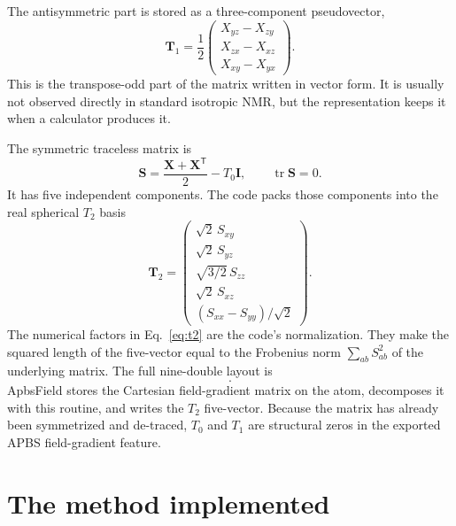 \documentclass[11pt]{article}
\begin{document}
The antisymmetric part is stored as a three-component pseudovector,
\begin{equation}
  \bm T_1 =
  \frac{1}{2}
  \begin{pmatrix}
    X_{yz}-X_{zy}\\
    X_{zx}-X_{xz}\\
    X_{xy}-X_{yx}
  \end{pmatrix}.
  \label{eq:t1}
\end{equation}
This is the transpose-odd part of the matrix written in vector form. It is
usually not observed directly in standard isotropic NMR, but the representation
keeps it when a calculator produces it.

The symmetric traceless matrix is
\begin{equation}
  \bm S =
  \frac{\bm X+\bm X^{\mathsf T}}{2}
  - T_0\bm I ,
  \qquad \operatorname{tr}\bm S=0 .
  \label{eq:sym-traceless}
\end{equation}
It has five independent components. The code packs those components into the
real spherical \(T_2\) basis
\begin{equation}
  \bm T_2 =
  \begin{pmatrix}
    \sqrt{2}\,S_{xy}\\
    \sqrt{2}\,S_{yz}\\
    \sqrt{3/2}\,S_{zz}\\
    \sqrt{2}\,S_{xz}\\
    (S_{xx}-S_{yy})/\sqrt{2}
  \end{pmatrix}.
  \label{eq:t2}
\end{equation}
The numerical factors in Eq.~\eqref{eq:t2} are the code's normalization. They
make the squared length of the five-vector equal to the Frobenius norm
\(\sum_{ab}S_{ab}^2\) of the underlying matrix. The full nine-double layout is
\begin{equation}
  [T_0,T_{1x},T_{1y},T_{1z},
    T_{2,-2},T_{2,-1},T_{2,0},T_{2,+1},T_{2,+2}] .
\end{equation}
ApbsField stores the Cartesian field-gradient matrix on the atom, decomposes it
with this routine, and writes the \(T_2\) five-vector. Because the matrix has
already been symmetrized and de-traced, \(T_0\) and \(T_1\) are structural
zeros in the exported APBS field-gradient feature.

\section{The method implemented}
\end{document}
